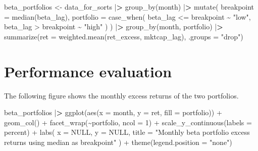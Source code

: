 \documentclass[
]{book}
\newenvironment{Shaded}{\begin{snugshade}}{\end{snugshade}}
\newcommand{\AttributeTok}[1]{\textcolor[rgb]{0.61,0.61,0.61}{#1}}
\newcommand{\ConstantTok}[1]{\textcolor[rgb]{0,0,0}{#1}}
\newcommand{\DecValTok}[1]{\textcolor[rgb]{0.06,0.06,0.06}{#1}}
\newcommand{\ErrorTok}[1]{\textcolor[rgb]{0.14,0.14,0.14}{\textbf{#1}}}
\newcommand{\FunctionTok}[1]{\textcolor[rgb]{0,0,0}{#1}}
\newcommand{\NormalTok}[1]{#1}
\newcommand{\OtherTok}[1]{\textcolor[rgb]{0.37,0.37,0.37}{#1}}
\newcommand{\SpecialCharTok}[1]{\textcolor[rgb]{0,0,0}{#1}}
\newcommand{\StringTok}[1]{\textcolor[rgb]{0.5,0.5,0.5}{#1}}
\begin{document}
\begin{Shaded}
\begin{Highlighting}[]
\NormalTok{beta\_portfolios }\OtherTok{\textless{}{-}}\NormalTok{ data\_for\_sorts }\SpecialCharTok{|}\ErrorTok{\textgreater{}}
  \FunctionTok{group\_by}\NormalTok{(month) }\SpecialCharTok{|}\ErrorTok{\textgreater{}}
  \FunctionTok{mutate}\NormalTok{(}
    \AttributeTok{breakpoint =} \FunctionTok{median}\NormalTok{(beta\_lag),}
    \AttributeTok{portfolio =} \FunctionTok{case\_when}\NormalTok{(}
\NormalTok{      beta\_lag }\SpecialCharTok{\textless{}=}\NormalTok{ breakpoint }\SpecialCharTok{\textasciitilde{}} \StringTok{"low"}\NormalTok{,}
\NormalTok{      beta\_lag }\SpecialCharTok{\textgreater{}}\NormalTok{ breakpoint }\SpecialCharTok{\textasciitilde{}} \StringTok{"high"}
\NormalTok{    )}
\NormalTok{  ) }\SpecialCharTok{|}\ErrorTok{\textgreater{}}
  \FunctionTok{group\_by}\NormalTok{(month, portfolio) }\SpecialCharTok{|}\ErrorTok{\textgreater{}}
  \FunctionTok{summarize}\NormalTok{(}\AttributeTok{ret =} \FunctionTok{weighted.mean}\NormalTok{(ret\_excess, mktcap\_lag), }\AttributeTok{.groups =} \StringTok{"drop"}\NormalTok{)}
\end{Highlighting}
\end{Shaded}

\hypertarget{performance-evaluation}{%
\section{Performance evaluation}\label{performance-evaluation}}

The following figure shows the monthly excess returns of the two portfolios.

\begin{Shaded}
\begin{Highlighting}[]
\NormalTok{beta\_portfolios }\SpecialCharTok{|}\ErrorTok{\textgreater{}}
  \FunctionTok{ggplot}\NormalTok{(}\FunctionTok{aes}\NormalTok{(}\AttributeTok{x =}\NormalTok{ month, }\AttributeTok{y =}\NormalTok{ ret, }\AttributeTok{fill =}\NormalTok{ portfolio)) }\SpecialCharTok{+}
  \FunctionTok{geom\_col}\NormalTok{() }\SpecialCharTok{+}
  \FunctionTok{facet\_wrap}\NormalTok{(}\SpecialCharTok{\textasciitilde{}}\NormalTok{portfolio, }\AttributeTok{ncol =} \DecValTok{1}\NormalTok{) }\SpecialCharTok{+}
  \FunctionTok{scale\_y\_continuous}\NormalTok{(}\AttributeTok{labels =}\NormalTok{ percent) }\SpecialCharTok{+}
  \FunctionTok{labs}\NormalTok{(}
    \AttributeTok{x =} \ConstantTok{NULL}\NormalTok{, }\AttributeTok{y =} \ConstantTok{NULL}\NormalTok{,}
    \AttributeTok{title =} \StringTok{"Monthly beta portfolio excess returns using median as breakpoint"}
\NormalTok{  ) }\SpecialCharTok{+}
  \FunctionTok{theme}\NormalTok{(}\AttributeTok{legend.position =} \StringTok{"none"}\NormalTok{)}
\end{Highlighting}
\end{Shaded}
\end{document}
